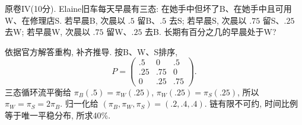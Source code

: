 \begin{exercise}\label{ex:flp-IV}
原卷IV(10分). Elaine旧车每天早晨有三态: 在她手中但坏了B、在她手中且可用W、在修理店S. 若早晨B, 次晨以 $.5$ 留B、$.5$ 去S; 若早晨S, 次晨以 $.75$ 留S、$.25$ 去W; 若早晨W, 次晨以 $.75$ 留W、$.25$ 去B. 长期有百分之几的早晨处于W?
\end{exercise}
\begin{solution}\label{sol:flp-IV}
依据官方解答重构, 补齐推导. 按B、W、S排序,
\[P=\begin{pmatrix}.5&0&.5\\.25&.75&0\\0&.25&.75\end{pmatrix}.\]
三态循环流平衡给 $\pi_B(.5)=\pi_W(.25)$, $\pi_W(.25)=\pi_S(.25)$, 所以 $\pi_W=\pi_S=2\pi_B$. 归一化给 $(\pi_B,\pi_W,\pi_S)=(.2,.4,.4)$. 链有限不可约, 时间比例等于唯一平稳分布, 所求40\%.
\end{solution}


